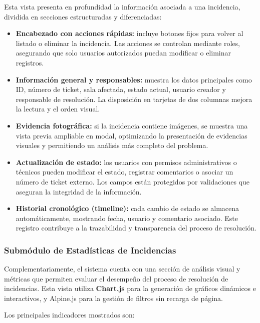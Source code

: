 Esta vista presenta en profundidad la información asociada a una incidencia, dividida en secciones estructuradas y diferenciadas:

\begin{itemize}
    \item \textbf{Encabezado con acciones rápidas:} incluye botones fijos para volver al listado o eliminar la incidencia. Las acciones se controlan mediante roles, asegurando que solo usuarios autorizados puedan modificar o eliminar registros.
    
    \item \textbf{Información general y responsables:} muestra los datos principales como ID, número de ticket, sala afectada, estado actual, usuario creador y responsable de resolución. La disposición en tarjetas de dos columnas mejora la lectura y el orden visual.
    
    \item \textbf{Evidencia fotográfica:} si la incidencia contiene imágenes, se muestra una vista previa ampliable en modal, optimizando la presentación de evidencias visuales y permitiendo un análisis más completo del problema.
    
    \item \textbf{Actualización de estado:} los usuarios con permisos administrativos o técnicos pueden modificar el estado, registrar comentarios o asociar un número de ticket externo. Los campos están protegidos por validaciones que aseguran la integridad de la información.
    
    \item \textbf{Historial cronológico (timeline):} cada cambio de estado se almacena automáticamente, mostrando fecha, usuario y comentario asociado. Este registro contribuye a la trazabilidad y transparencia del proceso de resolución.
\end{itemize}

\subsubsection{Submódulo de Estadísticas de Incidencias}

Complementariamente, el sistema cuenta con una sección de análisis visual y métricas que permiten evaluar el desempeño del proceso de resolución de incidencias. Esta vista utiliza \textbf{Chart.js} para la generación de gráficos dinámicos e interactivos, y Alpine.js para la gestión de filtros sin recarga de página.

Los principales indicadores mostrados son:

